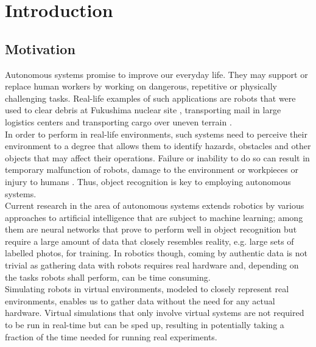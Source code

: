 \chapter{Introduction}

\section{Motivation}
Autonomous systems promise to improve our everyday life. They may support or replace human workers by working on dangerous, repetitive or physically challenging tasks. Real-life examples of such applications are robots that were used to clear debris at Fukushima nuclear site \cite{fukushimaRobots}, transporting mail in large logistics centers \cite{dhlLogisticsRobots} and transporting cargo over uneven terrain \cite{RAIBERT200810822}.\\
In order to perform in real-life environments, such systems need to perceive their environment to a degree that allows them to identify hazards, obstacles and other objects that may affect their operations. Failure or inability to do so can result in temporary malfunction of robots, damage to the environment or workpieces or injury to humans \cite{robotVolkswagen}. Thus, object recognition is key to employing autonomous systems.\\
Current research in the area of autonomous systems extends robotics by various approaches to artificial intelligence that are subject to machine learning; among them are neural networks that prove to perform well in object recognition but require a large amount of data that closely resembles reality, e.g. large sets of labelled photos, for training. In robotics though, coming by authentic data is not trivial as gathering data with robots requires real hardware and, depending on the tasks robots shall perform, can be time consuming.\\
Simulating robots in virtual environments, modeled to closely represent real environments, enables us to gather data without the need for any actual hardware. Virtual simulations that only involve virtual systems are not required to be run in real-time but can be sped up, resulting in potentially taking a fraction of the time needed for running real experiments.

